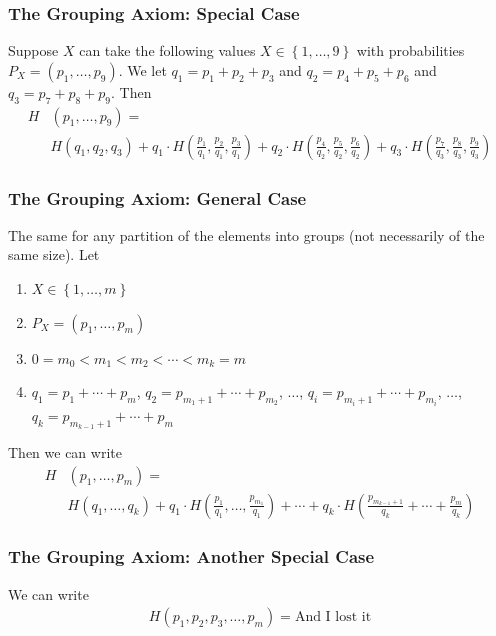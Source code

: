 \documentclass{article}
\begin{document}
\subsubsection{The Grouping Axiom: Special Case}

Suppose $X$ can take the following values $X\in\left\{1,\ldots,9\right\}$ with probabilities $P_X=\left(p_1,\ldots, p_9\right)$. We let $q_1=p_1+p_2+p_3$ and $q_2=p_4+p_5+p_6$ and $q_3=p_7+p_8+p_9$. Then 
\begin{align*}
    H&\left(p_1,\ldots, p_9 \right) =\\
    &H\left(q_1,q_2,q_3\right) + q_1\cdot H\left(\frac{p_1}{q_1},\frac{p_2}{q_1},\frac{p_3}{q_1}\right) + q_2\cdot H\left(\frac{p_4}{q_2},\frac{p_5}{q_2},\frac{p_6}{q_2}\right) + q_3\cdot H\left(\frac{p_7}{q_3},\frac{p_8}{q_3},\frac{p_9}{q_3}\right)
\end{align*}

\subsubsection{The Grouping Axiom: General Case}

The same for any partition of the elements into groups (not necessarily of the same size). Let 
\begin{enumerate}
    \item $X\in\left\{1,\ldots,m\right\}$
    \item $P_X=\left(p_1,\ldots,p_m\right)$
    \item $0=m_0 < m_1 < m_2 < \cdots < m_k=m$
    \item $q_1=p_1+\cdots + p_m$, $q_2=p_{m_1+1}+\cdots + p_{m_2}$, $\ldots$, $q_i=p_{m_i+1}+\cdots + p_{m_i}$, $\ldots$, $q_k=p_{m_{k-1}+1}+\cdots+p_m$
\end{enumerate}
Then we can write 
\begin{align}
    H&(p_1,\ldots,p_m)=\\
    &H(q_1,\ldots,q_k) + q_1 \cdot H(\frac{p_1}{q_1},\ldots, \frac{p_{m_1}}{q_1})+\cdots + q_k \cdot H\left( \frac{p_{m_{k-1}+1}}{q_k}+\cdots+ \frac{p_m}{q_k} \right)
\end{align}


\subsubsection{The Grouping Axiom: Another Special Case}

We can write 
\begin{align*}
    H\left(p_1,p_2,p_3,\ldots, p_m\right)= \text{And I lost it}
\end{align*}
\end{document}
